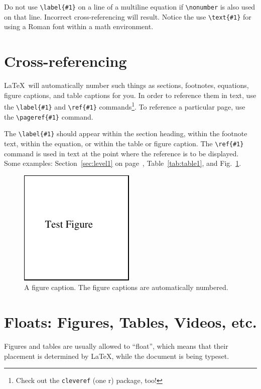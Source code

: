 \documentclass[]{article}
\begin{document}
Do not use \verb+\label{#1}+ on a line of a multiline
equation if \verb+\nonumber+ is also used on that line. Incorrect
cross-referencing will result. Notice the use \verb+\text{#1}+ for
using a Roman font within a math environment.

\section{Cross-referencing}
\LaTeX\ will automatically number such things as
sections, footnotes, equations, figure captions, and table captions for you. 
In order to reference them in text, use the
\verb+\label{#1}+ and \verb+\ref{#1}+ commands\footnote{Check out the \texttt{cleveref} (one r) package, too!}. 
To reference a particular page, use the \verb+\pageref{#1}+ command.

The \verb+\label{#1}+ should appear 
within the section heading, 
within the footnote text, 
within the equation, or 
within the table or figure caption. 
The \verb+\ref{#1}+ command
is used in text at the point where the reference is to be displayed.  
Some examples: Section~\ref{sec:level1} on page~\pageref{sec:level1},
Table~\ref{tab:table1}, and Fig.~\ref{fig:epsart}.
\begin{figure}[b]
  \centering
  \includegraphics{figures/fig_1}%
  \caption{\label{fig:epsart} A figure caption. The figure captions are
automatically numbered.}
\end{figure}

\section{Floats: Figures, Tables, Videos, etc.}
Figures and tables are usually allowed to ``float'', which means that their
placement is determined by \LaTeX, while the document is being typeset. 
\end{document}
